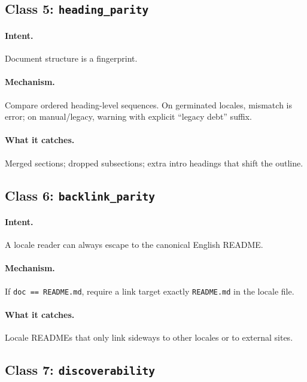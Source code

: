 \documentclass[11pt]{article}
\theoremstyle{definition}
\theoremstyle{plain}
\theoremstyle{remark}
\begin{document}
\subsection{Class 5: \texttt{heading\_parity}}

\paragraph{Intent.} Document structure is a fingerprint.

\paragraph{Mechanism.} Compare ordered heading-level sequences. On
germinated locales, mismatch is error; on manual/legacy, warning with
explicit ``legacy debt'' suffix.

\paragraph{What it catches.} Merged sections; dropped subsections; extra
intro headings that shift the outline.

\subsection{Class 6: \texttt{backlink\_parity}}

\paragraph{Intent.} A locale reader can always escape to the canonical
English README.

\paragraph{Mechanism.} If \texttt{doc == README.md}, require a link target
exactly \texttt{README.md} in the locale file.

\paragraph{What it catches.} Locale READMEs that only link sideways to other
locales or to external sites.

\subsection{Class 7: \texttt{discoverability}}
\end{document}
